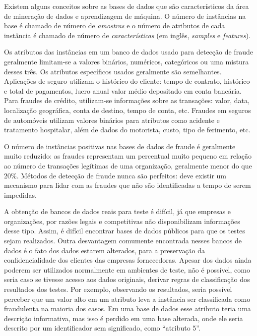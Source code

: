 Existem alguns conceitos sobre as bases de dados que são característicos da área de mineração de dados e aprendizagem de máquina. O número de instâncias na base é chamado de número de \emph{amostras} e o número de atributos de cada instância é chamado de número de \emph{características} (em inglês, \emph{samples} e \emph{features}).

Os atributos das instâncias em um banco de dados usado para detecção de fraude geralmente limitam-se a valores binários, numéricos, categóricos ou uma mistura desses três. Os atributos específicos usados geralmente são semelhantes. Aplicações de seguro utilizam o histórico do cliente: tempo de contrato, histórico e total de pagamentos, lucro anual valor médio depositado em conta bancária. Para fraudes de crédito, utilizam-se informações sobre as transações: valor, data, localização geográfica, conta de destino, tempo de conta, etc. Fraudes em seguros de automóveis utilizam valores binários para atributos como acidente e tratamento hospitalar, além de dados do motorista, custo, tipo de ferimento, etc.

O número de instâncias positivas nas bases de dados de fraude é geralmente muito reduzido: as fraudes representam um percentual muito pequeno em relação ao número de transações legítimas de uma organização, geralmente menor do que 20\%. Métodos de detecção de fraude nunca são perfeitos: deve existir um mecanismo para lidar com as fraudes que não são identificadas a tempo de serem impedidas.

A obtenção de bancos de dados reais para teste é difícil, já que empresas e organizações, por razões legais e competitivas não disponibilizam informações desse tipo. Assim, é difícil encontrar bases de dados públicos para que os testes sejam realizados. Outra desvantagem comumente encontrada nesses bancos de dados é o fato dos dados estarem alterados, para a preservação da confidencialidade dos clientes das empresas fornecedoras. Apesar dos dados ainda poderem ser utilizados normalmente em ambientes de teste, não é possível, como seria caso se tivesse acesso aos dados originais, derivar regras de classificação dos resultados dos testes. Por exemplo, observando os resultados, seria possível perceber que um valor alto em um atributo leva a instância ser classificada como fraudulenta na maioria dos casos. Em uma base de dados esse atributo teria uma descrição informativa, mas isso é perdido em uma base alterada, onde ele seria descrito por um identificador sem significado, como ``atributo 5''.

